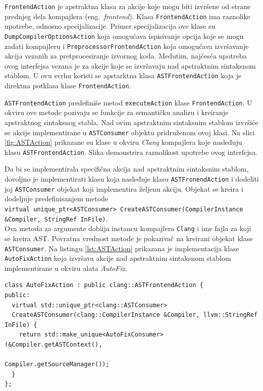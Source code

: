 \documentclass[12pt,oneside]{memoir}
\begin{document}
\texttt{FrontendAction} je apstraktna klasa za akcije koje mogu biti izvr\v{s}ene od strane prednjeg dela kompajlera (eng.~\textit{frontend}).
Klasa \texttt{FrontendAction} ima raznolike upotrebe, odnosno specijalizacije. Primer specijalizacija ove klase su \texttt{DumpCompiler\-OptionsAction}
koja omogu\'{c}ava ispisivanje opcija koje se mogu zadati kompajleru i \texttt{PreprocessorFrontendAction} koja omogu\'{c}ava izvr\v{s}avanje akcija vezanih za pretprocesiranje izvornog koda. Međutim, naj\v{c}es\'{c}a upotreba ovog interfejsa vezana je za akcije koje se izvr\v{s}avaju nad apstraktnim sintaksnom stablom. U ovu svrhu koristi se apstarktna klasa \texttt{ASTFrontendAction} koja je direktna potklasa klase \texttt{FrontendAction}. \par
\texttt{ASTFrontendAction} predefini\v{s}e metod \texttt{executeAction} klase \texttt{FrontendAction}. U okviru ove metode pozivaju se funkcije za semanti\v{c}ku analizu i kreiranje apstraktnog sintaksnog stabla. Nad ovim apstraktnim sintaksnim stablom izvr\v{s}i\'{c}e se akcije implementirane u \texttt{ASTConsumer} objektu pridru\v{z}enom ovoj klasi.
Na slici \ref{fig:ASTAction} prikazane su klase u okviru \textit{Clang} kompajlera koje nasleđuju klasu \texttt{ASTFrontendAction}. Slika demonstrira raznolikost upotrebe ovog interfejsa. \par
Da bi se implementirala specifi\v{c}na akcija nad apstraktnim sintaksnim stablom, dovoljno je implementirati klasu koja nasleđuje klasu \texttt{ASTFronendAction} i dodeliti joj \texttt{ASTConsumer} objekat koji implementira \v{z}eljenu akciju. Objekat se kreira i dodeljuje predefinisanjem metode \\ \texttt{virtual unique\_ptr<ASTConsumer> CreateASTConsumer(CompilerInstance 
\&Compiler, StringRef InFile)}. \\
Ova metoda za argumente dobiija instancu kompajlera \texttt{Clang} i ime fajla za koji se kreira AST. Povratna vrednost metode je pokaziva\v{c} na kreirani objekat klase \texttt{ASTConsumer}.
Na listingu \ref{lst:ASTAction} prikazana je implementacija klase \texttt{AutoFixAction} koja izvr\v{s}ava akcije nad apstraktnim sintaksnom stablom implementirane u okviru alata \textit{AutoFix}.

\begin{lstlisting}[style=customc,  caption={Implementacija klase AutoFixAction kori\v{s}\'{c}ene u okviru alata \textit{AutoFix}.}, label=lst:ASTAction]
class AutoFixAction : public clang::ASTFrontendAction {
public:
  virtual std::unique_ptr<clang::ASTConsumer>
  CreateASTConsumer(clang::CompilerInstance &Compiler, llvm::StringRef InFile) {
    return std::make_unique<AutoFixConsumer>(&Compiler.getASTContext(),
                                             Compiler.getSourceManager());
  }
};
\end{lstlisting}
\end{document}
